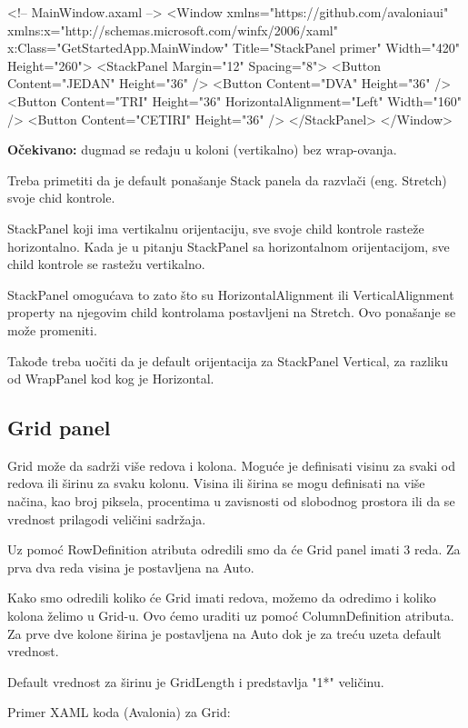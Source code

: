 \documentclass[11pt,a4paper]{article}
\begin{document}
\begin{CodeBlock}
<!-- MainWindow.axaml -->
<Window xmlns="https://github.com/avaloniaui"
        xmlns:x="http://schemas.microsoft.com/winfx/2006/xaml"
        x:Class="GetStartedApp.MainWindow"
        Title="StackPanel primer" Width="420" Height="260">
  <StackPanel Margin="12" Spacing="8">
    <Button Content="JEDAN" Height="36" />
    <Button Content="DVA" Height="36" />
    <Button Content="TRI" Height="36" HorizontalAlignment="Left" Width="160" />
    <Button Content="CETIRI" Height="36" />
  </StackPanel>
</Window>
\end{CodeBlock}

\textbf{Očekivano:} dugmad se ređaju u koloni (vertikalno) bez wrap-ovanja.

Treba primetiti da je default ponašanje Stack panela da razvlači (eng. Stretch) svoje chid kontrole.

StackPanel koji ima vertikalnu orijentaciju, sve svoje child kontrole rasteže horizontalno. Kada je u pitanju StackPanel sa horizontalnom orijentacijom, sve child kontrole se rastežu vertikalno.

StackPanel omogućava to zato što su HorizontalAlignment ili VerticalAlignment property na njegovim child kontrolama postavljeni na Stretch. Ovo ponašanje se može promeniti.

Takođe treba uočiti da je default orijentacija za StackPanel Vertical, za razliku od WrapPanel kod kog je Horizontal.

\subsection{Grid panel}
Grid može da sadrži više redova i kolona. Moguće je definisati visinu za svaki od redova ili širinu za svaku kolonu. Visina ili širina se mogu definisati na više načina, kao broj piksela, procentima u zavisnosti od slobodnog prostora ili da se vrednost prilagodi veličini sadržaja.

Uz pomoć RowDefinition atributa odredili smo da će Grid panel imati 3 reda. Za prva dva reda visina je postavljena na Auto.

Kako smo odredili koliko će Grid imati redova, možemo da odredimo i koliko kolona želimo u Grid-u. Ovo ćemo uraditi uz pomoć ColumnDefinition atributa. Za prve dve kolone širina je postavljena na Auto dok je za treću uzeta default vrednost.

Default vrednost za širinu je GridLength i predstavlja "1*" veličinu.

Primer XAML koda (Avalonia) za Grid:
\end{document}
